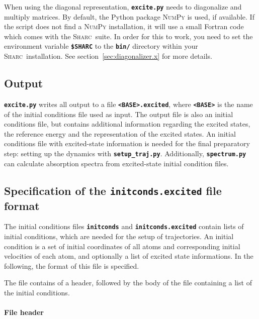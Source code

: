 \documentclass[a4paper,11pt,DIV=15,openany,twoside=false]{scrbook}
\newcommand{\sharc}{\textsc{Sharc}}
\newcommand{\ttt}[1]{\textbf{\texttt{#1}}}
\begin{document}
When using the diagonal representation, \ttt{excite.py} needs to diagonalize and multiply matrices. By default, the Python package \textsc{NumPy} is used, if available. If the script does not find a \textsc{NumPy} installation, it will use a small Fortran code which comes with the \sharc\ suite. In order for this to work, you need to set the environment variable \ttt{\$SHARC} to the \ttt{bin/} directory within your \sharc\ installation. See section~\ref{sec:diagonalizer.x} for more details.

\subsection{Output}

\ttt{excite.py} writes all output to a file \ttt{<BASE>.excited}, where \ttt{<BASE>} is the name of the initial conditions file used as input. The output file is also an initial conditions file, but contains additional information regarding the excited states, the reference energy and the representation of the excited states. An initial conditions file with excited-state information is needed for the final preparatory step: setting up the dynamics with \ttt{setup\_traj.py}.
Additionally, \ttt{spectrum.py} can calculate absorption spectra from excited-state initial condition files.

\subsection{Specification of the \ttt{initconds.excited} file format}\label{sec:initcondsfile}

The initial conditions files \ttt{initconds} and \ttt{initconds.excited} contain lists of initial conditions, which are needed for the setup of trajectories. An initial condition is a set of initial coordinates of all atoms and corresponding initial velocities of each atom, and optionally a list of excited state informations. In the following, the format of this file is specified.

The file contains of a header, followed by the body of the file containing a list of the initial conditions. 

\paragraph{File header}
\end{document}

